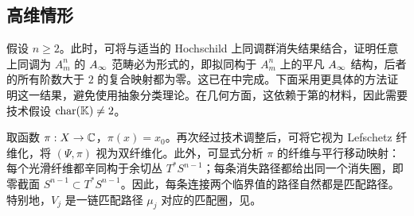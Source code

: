 \subsection{高维情形}\label{sec:20b}
假设 $n\ge2$。此时，可将与适当的 Hochschild 上同调群消失结果结合，证明任意上同调为 $A_m^n$ 的 $A_\infty$ 范畴必为形式的，即拟同构于 $A_m^n$ 上的平凡 $A_\infty$ 结构，后者的所有阶数大于 $2$ 的复合映射都为零。这已在中完成。下面采用更具体的方法证明这一结果，避免使用抽象分类理论。在几何方面，这依赖于第的材料，因此需要技术假设 $\operatorname{char}(\mathbb K)\ne2$。

取函数 $\pi:X\to\mathbb C$，$\pi(x)=x_0$。再次经过技术调整后，可将它视为 Lefschetz 纤维化，将 $(\Psi,\pi)$ 视为双纤维化。此外，可显式分析 $\pi$ 的纤维与平行移动映射：每个光滑纤维都辛同构于余切丛 $T^*S^{n-1}$；每条消失路径都给出同一个消失圈，即零截面
$S^{n-1}\subset T^*S^{n-1}$。因此，每条连接两个临界值的路径自然都是匹配路径。特别地，$V_j$ 是一链匹配路径 $\mu_j$ 对应的匹配圈，见。

